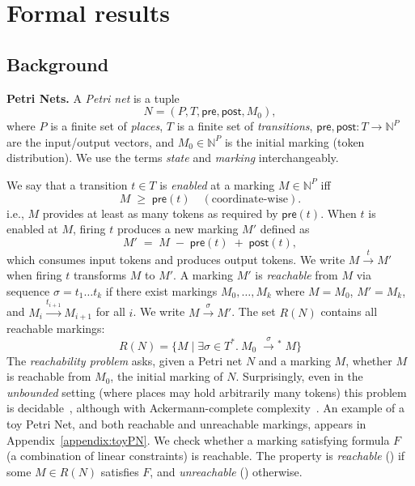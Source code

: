 \section{Formal results}
\label{sec:formal-results}



\subsection{Background}

\textbf{Petri Nets.}
A \emph{Petri net} is a tuple
\[
N = (P, T, \mathsf{pre}, \mathsf{post}, M_0),
\]
where \(P\) is a finite set of \emph{places}, \(T\) is a finite set of \emph{transitions},
\(\mathsf{pre},\mathsf{post}:T\to\mathbb N^P\) are the input/output vectors, and
\(M_0\in\mathbb N^P\) is the initial marking (token distribution). We use the terms \textit{state} and \textit{marking} interchangeably.

\noindent We say that a transition \(t\in T\) is \emph{enabled} at a marking \(M\in\mathbb N^P\) iff
\[
M \;\ge\; \mathsf{pre}(t)
\quad(\text{coordinate‐wise}).
\]
i.e., $M$ provides at least as many tokens as required by $\mathsf{pre}(t)$.
When $t$ is enabled at $M$, firing $t$ produces a new marking $M'$ defined as
\[
M' \;=\; M \;-\;\mathsf{pre}(t)\;+\;\mathsf{post}(t),
\]
which consumes input tokens and produces output tokens. We write $M \xrightarrow{t} M'$ when firing $t$ transforms $M$ to $M'$.
%
A marking \(M'\) is \emph{reachable} from $M$ via sequence $\sigma = t_1 \ldots t_k$ if there exist markings $M_0, \ldots, M_k$ where $M = M_0$, $M' = M_k$, and $M_i \xrightarrow{t_{i+1}} M_{i+1}$ for all $i$. We write $M \xrightarrow{\sigma} M'$.
The set $R(N)$ contains all reachable markings:
\[
R(N) = \{M \mid \exists \sigma \in T^* .\ M_0 \;\xrightarrow{\sigma}\!^*\; M\}
\]
%
The \emph{reachability problem} asks, given a Petri net $N$ and a marking $M$, whether $M$ is reachable from $M_0$, the initial marking of $N$.  Surprisingly, even in the
\emph{unbounded} setting (where places may hold arbitrarily many tokens) this problem is
decidable~\cite{Ma81,Ko82,La92}, although with
Ackermann-complete complexity~\cite{CzWo22,Le22}.
%
An example of a toy Petri Net, and both reachable and unreachable markings, appears in Appendix~\ref{appendix:toyPN}.
%
We check whether a marking satisfying formula $F$ (a combination of linear constraints) is reachable. The property is \textit{reachable} (\sat) if some $M \in R(N)$ satisfies $F$, and \textit{unreachable} (\unsat) otherwise. 

